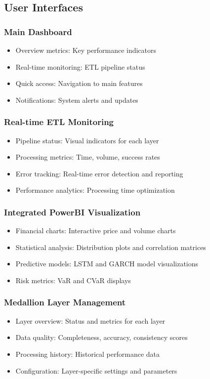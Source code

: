 \documentclass[12pt,a4paper]{article}
\begin{document}
\subsection{User Interfaces}
\subsubsection{Main Dashboard}
\begin{itemize}
    \item Overview metrics: Key performance indicators
    \item Real-time monitoring: ETL pipeline status
    \item Quick access: Navigation to main features
    \item Notifications: System alerts and updates
\end{itemize}

\subsubsection{Real-time ETL Monitoring}
\begin{itemize}
    \item Pipeline status: Visual indicators for each layer
    \item Processing metrics: Time, volume, success rates
    \item Error tracking: Real-time error detection and reporting
    \item Performance analytics: Processing time optimization
\end{itemize}

\subsubsection{Integrated PowerBI Visualization}
\begin{itemize}
    \item Financial charts: Interactive price and volume charts
    \item Statistical analysis: Distribution plots and correlation matrices
    \item Predictive models: LSTM and GARCH model visualizations
    \item Risk metrics: VaR and CVaR displays
\end{itemize}

\subsubsection{Medallion Layer Management}
\begin{itemize}
    \item Layer overview: Status and metrics for each layer
    \item Data quality: Completeness, accuracy, consistency scores
    \item Processing history: Historical performance data
    \item Configuration: Layer-specific settings and parameters
\end{itemize}
\end{document}
